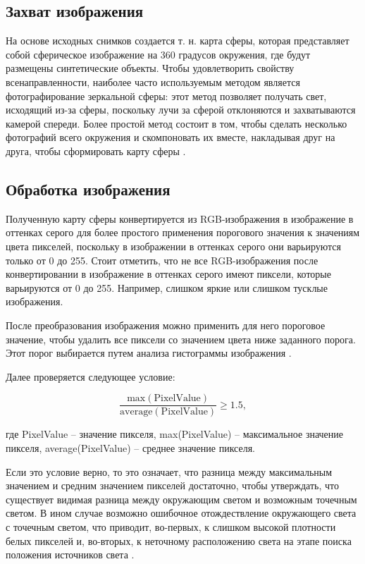 \subsection{Захват изображения}

На основе исходных снимков создается т. н. карта сферы, которая представляет собой сферическое изображение на 360 градусов окружения, где будут размещены синтетические объекты. Чтобы удовлетворить свойству всенаправленности, наиболее часто используемым методом является фотографирование зеркальной сферы: этот метод позволяет получать свет, исходящий из-за сферы, поскольку лучи за сферой отклоняются и захватываются камерой спереди. Более простой метод состоит в том, чтобы сделать несколько фотографий всего окружения и скомпоновать их вместе, накладывая друг на друга, чтобы сформировать карту сферы \cite{osti2019real}.

\subsection{Обработка изображения}

Полученную карту сферы конвертируется из RGB-изображения в изображение в оттенках серого для более простого применения порогового значения к значениям цвета пикселей, поскольку в изображении в оттенках серого они варьируются только от 0 до 255. Стоит отметить, что не все RGB-изображения после конвертировании в изображение в оттенках серого имеют пиксели, которые варьируются от 0 до 255. Например, слишком яркие или слишком тусклые изображения.

После преобразования изображения можно применить для него пороговое значение, чтобы удалить все пиксели со значением цвета ниже заданного порога. Этот порог выбирается путем анализа гистограммы изображения \cite{img_hists}.

Далее проверяется следующее условие:

\begin{equation}
	\frac{\text{max}(\text{PixelValue})}{\text{average}(\text{PixelValue})} \geq 1.5,
\end{equation}

где PixelValue -- значение пикселя, max(PixelValue) -- максимальное значение пикселя, average(PixelValue) -- среднее значение пикселя.

Если это условие верно, то это означает, что разница между максимальным значением и средним значением пикселей достаточно, чтобы утверждать, что существует видимая разница между окружающим светом и возможным точечным светом. В ином случае возможно ошибочное отождествление окружающего света с точечным светом, что приводит, во-первых, к слишком высокой плотности белых пикселей и, во-вторых, к неточному расположению света на этапе поиска положения источников света \cite{osti2019real}.

